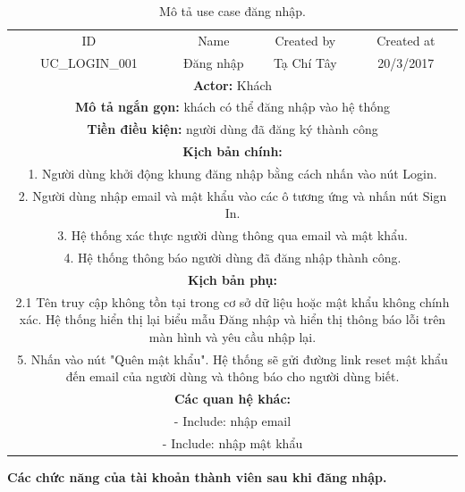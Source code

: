 \documentclass[a4paper,12pt,oneside]{article}
\begin{document}
\begin{table}[!htp]
\centering
\begin{tabularx}{\linewidth}{ |c||c|c|c| }
\hline
ID & Name & Created by & Created at\\
UC\_LOGIN\_001 & Đăng nhập & Tạ Chí Tây & 20/3/2017\\
\hline
\multicolumn{4}{|X|}{\textbf{Actor:} Khách }\\
\hline
\multicolumn{4}{|X|}{\textbf{Mô tả ngắn gọn:} khách có thể đăng nhập vào hệ thống }\\
\hline
\multicolumn{4}{|X|}{\textbf{Tiền điều kiện:} người dùng đã đăng ký thành công}\\
\hline
\multicolumn{4}{|X|}{\textbf{Kịch bản chính:}}\\
\multicolumn{4}{|X|}{1. Người dùng khởi động khung đăng nhập bằng cách nhấn vào nút Login.}\\
\multicolumn{4}{|X|}{
2.	Người dùng nhập email và mật khẩu vào các ô tương ứng và nhấn nút Sign In.}\\
\multicolumn{4}{|X|}{
3.	Hệ thống xác thực người dùng thông qua email và mật khẩu.}\\
\multicolumn{4}{|X|}{
4.	Hệ thống thông báo người dùng đã đăng nhập thành công.}\\
\hline
\multicolumn{4}{|X|}{\textbf{Kịch bản phụ:}}\\
\multicolumn{4}{|X|}{2.1 Tên truy cập không tồn tại trong cơ sở dữ liệu hoặc mật khẩu không chính xác. Hệ thống hiển thị lại biểu mẫu Đăng nhập và hiển thị thông báo lỗi trên màn hình và yêu cầu nhập lại.}\\
\multicolumn{4}{|X|}{5. Nhấn vào nút "Quên mật khẩu". Hệ thống sẽ gửi đường link reset mật khẩu đến email của người dùng và thông báo cho người dùng biết.}\\
\hline
\multicolumn{4}{|X|}{\textbf{Các quan hệ khác:}}\\
\multicolumn{4}{|X|}{- Include: nhập email}\\
\multicolumn{4}{|X|}{- Include: nhập mật khẩu}\\
\hline
\end{tabularx}
\caption{Mô tả use case đăng nhập.}
\end{table}

\newpage
\indent \textbf{Các chức năng của tài khoản thành viên sau khi đăng nhập.}\\
\end{document}
